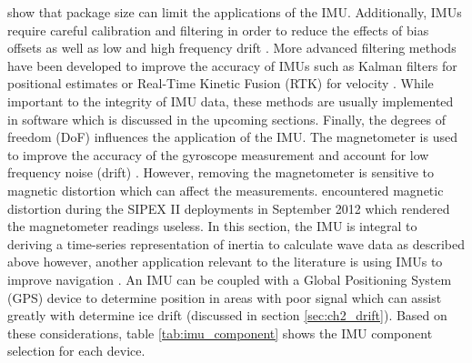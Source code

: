 \textcite{ahmad2013reviews} show that package size can limit the applications of the IMU. Additionally, IMUs require careful calibration and filtering in order to reduce the effects of bias offsets as well as low and high frequency drift \cite{fong2008methods}. More advanced filtering methods have been developed to improve the accuracy of IMUs such as Kalman filters \cite{simon2001kalman}  for positional estimates or Real-Time Kinetic Fusion (RTK) for velocity \textcite{meng2014optimal}. While important to the integrity of IMU data, these methods are usually implemented in software which is discussed in the upcoming sections. Finally, the degrees of freedom (DoF) influences the application of the IMU. The magnetometer is used to improve the accuracy of the gyroscope measurement and account for low frequency noise (drift) \cite{ahmad2013reviews}. However, removing the magnetometer is sensitive to magnetic distortion which can affect the measurements. \textcite{kohout2015device} encountered magnetic distortion during the SIPEX II deployments in September 2012 which rendered the magnetometer readings useless. In this section, the IMU is integral to deriving a time-series representation of inertia to calculate wave data as described above however, another application relevant to the literature is using IMUs to improve navigation \cite{ahmad2013reviews}. An IMU can be coupled with a Global Positioning System (GPS) device to determine position in areas with poor signal which can assist greatly with determine ice drift (discussed in section \ref{sec:ch2_drift}). Based on these considerations, table \ref{tab:imu_component} shows the IMU component selection for each device.
 

